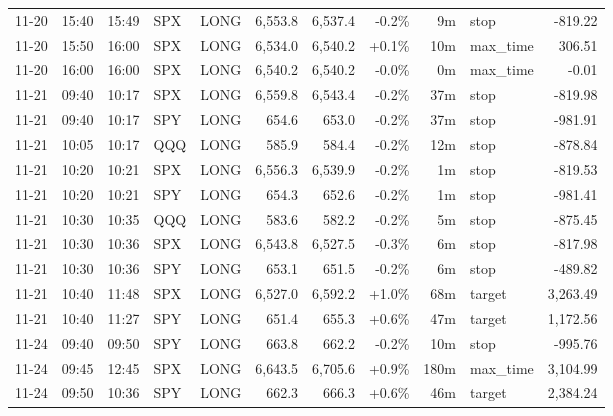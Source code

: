 \documentclass[11pt,a4paper,twoside]{article}
\begin{document}
\begin{center}
\begin{longtable}{>{\color{txtmain}}l l l l l r r r r >{\color{txtmain}}l r}
11-20 & 15:40 & 15:49 & SPX & LONG & 6,553.8 & 6,537.4 & \textcolor{lossred}{-0.2\%} & 9m & stop & \textcolor{lossred}{-819.22} \\
11-20 & 15:50 & 16:00 & SPX & LONG & 6,534.0 & 6,540.2 & \textcolor{wingreen}{+0.1\%} & 10m & max\_time & \textcolor{wingreen}{306.51} \\
11-20 & 16:00 & 16:00 & SPX & LONG & 6,540.2 & 6,540.2 & \textcolor{lossred}{-0.0\%} & 0m & max\_time & \textcolor{lossred}{-0.01} \\
11-21 & 09:40 & 10:17 & SPX & LONG & 6,559.8 & 6,543.4 & \textcolor{lossred}{-0.2\%} & 37m & stop & \textcolor{lossred}{-819.98} \\
11-21 & 09:40 & 10:17 & SPY & LONG & 654.6 & 653.0 & \textcolor{lossred}{-0.2\%} & 37m & stop & \textcolor{lossred}{-981.91} \\
11-21 & 10:05 & 10:17 & QQQ & LONG & 585.9 & 584.4 & \textcolor{lossred}{-0.2\%} & 12m & stop & \textcolor{lossred}{-878.84} \\
11-21 & 10:20 & 10:21 & SPX & LONG & 6,556.3 & 6,539.9 & \textcolor{lossred}{-0.2\%} & 1m & stop & \textcolor{lossred}{-819.53} \\
11-21 & 10:20 & 10:21 & SPY & LONG & 654.3 & 652.6 & \textcolor{lossred}{-0.2\%} & 1m & stop & \textcolor{lossred}{-981.41} \\
11-21 & 10:30 & 10:35 & QQQ & LONG & 583.6 & 582.2 & \textcolor{lossred}{-0.2\%} & 5m & stop & \textcolor{lossred}{-875.45} \\
11-21 & 10:30 & 10:36 & SPX & LONG & 6,543.8 & 6,527.5 & \textcolor{lossred}{-0.3\%} & 6m & stop & \textcolor{lossred}{-817.98} \\
11-21 & 10:30 & 10:36 & SPY & LONG & 653.1 & 651.5 & \textcolor{lossred}{-0.2\%} & 6m & stop & \textcolor{lossred}{-489.82} \\
11-21 & 10:40 & 11:48 & SPX & LONG & 6,527.0 & 6,592.2 & \textcolor{wingreen}{+1.0\%} & 68m & target & \textcolor{wingreen}{3,263.49} \\
11-21 & 10:40 & 11:27 & SPY & LONG & 651.4 & 655.3 & \textcolor{wingreen}{+0.6\%} & 47m & target & \textcolor{wingreen}{1,172.56} \\
11-24 & 09:40 & 09:50 & SPY & LONG & 663.8 & 662.2 & \textcolor{lossred}{-0.2\%} & 10m & stop & \textcolor{lossred}{-995.76} \\
11-24 & 09:45 & 12:45 & SPX & LONG & 6,643.5 & 6,705.6 & \textcolor{wingreen}{+0.9\%} & 180m & max\_time & \textcolor{wingreen}{3,104.99} \\
11-24 & 09:50 & 10:36 & SPY & LONG & 662.3 & 666.3 & \textcolor{wingreen}{+0.6\%} & 46m & target & \textcolor{wingreen}{2,384.24} \\

\end{longtable}
\end{center}
\end{document}
